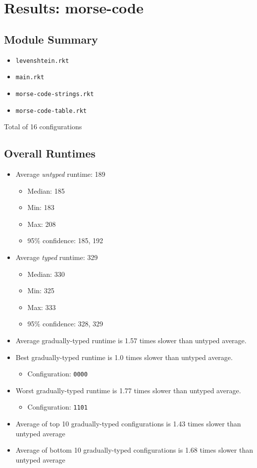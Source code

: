 \documentclass{article}
\newcommand{\mono}[1]{\texttt{#1}}
\begin{document}
\section{Results: morse-code}

\subsection{Module Summary}
\begin{itemize}
\item \mono{levenshtein.rkt}
\item \mono{main.rkt}
\item \mono{morse-code-strings.rkt}
\item \mono{morse-code-table.rkt}\end{itemize}
Total of 16 configurations

\subsection{Overall Runtimes}
\begin{itemize}
\item Average \emph{untyped} runtime: 189
  \begin{itemize}
  \item Median: 185
  \item Min: 183
  \item Max: 208
  \item 95\% confidence: 185, 192
  \end{itemize}
\item Average \emph{typed} runtime: 329
  \begin{itemize}
  \item Median: 330
  \item Min: 325
  \item Max: 333
  \item 95\% confidence: 328, 329
  \end{itemize}
\item Average gradually-typed runtime is 1.57 times slower than untyped average.
\item Best gradually-typed runtime is 1.0 times slower than untyped average.
\begin{itemize}\item Configuration: \mono{0000}\end{itemize}
\item Worst gradually-typed runtime is 1.77 times slower than untyped average.
\begin{itemize}\item Configuration: \mono{1101}\end{itemize}
\item Average of top 10 gradually-typed configurations is 1.43 times slower than untyped average
\item Average of bottom 10 gradually-typed configurations is 1.68 times slower than untyped average
\end{itemize}
\end{document}
